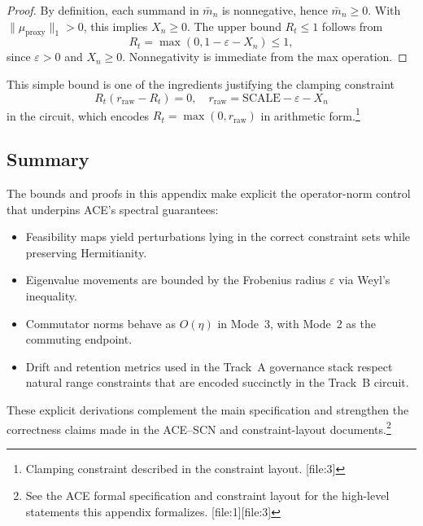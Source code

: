 \documentclass[11pt]{article}
\begin{document}
\begin{proof}
By definition, each summand in \(\bar m_n\) is nonnegative, hence \(\bar m_n\ge 0\). With \(\|\mu_{\mathrm{proxy}}\|_1>0\), this implies \(X_n\ge 0\). The upper bound \(R_t\le 1\) follows from
\[
R_t = \max(0, 1 - \varepsilon - X_n) \le 1,
\]
since \(\varepsilon>0\) and \(X_n\ge 0\). Nonnegativity is immediate from the max operation.
\end{proof}

This simple bound is one of the ingredients justifying the clamping constraint
\[
R_t(r_{\mathrm{raw}} - R_t) = 0,\quad r_{\mathrm{raw}} = \mathrm{SCALE} - \varepsilon - X_n
\]
in the circuit, which encodes \(R_t = \max(0,r_{\mathrm{raw}})\) in arithmetic form.\footnote{Clamping constraint described in the constraint layout. [file:3]}

\subsection{Summary}

The bounds and proofs in this appendix make explicit the operator-norm control that underpins ACE's spectral guarantees:
\begin{itemize}[leftmargin=*]
  \item Feasibility maps yield perturbations lying in the correct constraint sets while preserving Hermitianity.
  \item Eigenvalue movements are bounded by the Frobenius radius \(\varepsilon\) via Weyl's inequality.
  \item Commutator norms behave as \(O(\eta)\) in Mode~3, with Mode~2 as the commuting endpoint.
  \item Drift and retention metrics used in the Track~A governance stack respect natural range constraints that are encoded succinctly in the Track~B circuit.
\end{itemize}
These explicit derivations complement the main specification and strengthen the correctness claims made in the ACE–SCN and constraint-layout documents.\footnote{See the ACE formal specification and constraint layout for the high-level statements this appendix formalizes. [file:1][file:3]}
\nocite{*}
  

\end{document}
